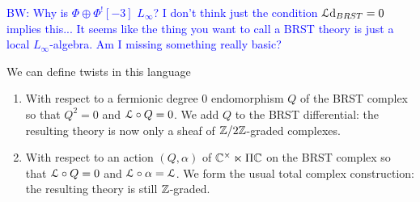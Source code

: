 \documentclass[10pt, oneside]{article}
\renewcommand{\d}{\mathrm{d}}
\def\brian{\textcolor{blue}{BW: }\textcolor{blue}}
\begin{document}
\brian{
Why is $\Phi \oplus \Phi^![-3]$ $L_\infty$? 
I don't think just the condition $\LL \d_{BRST} = 0$ implies this...
It seems like the thing you want to call a BRST theory is just a local $L_\infty$-algebra. 
Am I missing something really basic?
}

We can define twists in this language
\vspace{-10pt}
\begin{enumerate}
 \item With respect to a fermionic degree 0 endomorphism $Q$ of the BRST complex so that $Q^2 = 0$ and $\mathcal{L} \circ Q = 0$.  We add $Q$ to the BRST differential: the resulting theory is now only a sheaf of $\mathbb{Z}/2\mathbb{Z}$-graded complexes.
 \item With respect to an action $(Q,\alpha)$ of $\mathbb{C}^\times \ltimes \Pi \mathbb{C}$ on the BRST complex so that $\mathcal{L} \circ Q = 0$ and $\mathcal{L} \circ \alpha = \mathcal{L}$.  We form the usual total complex construction: the resulting theory is still $\mathbb{Z}$-graded.
\end{enumerate}
\vspace{-10pt}
\end{document}
